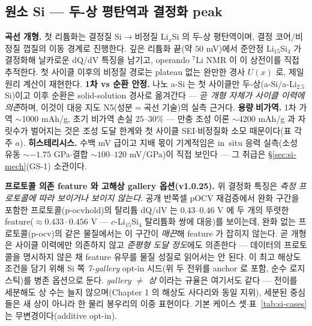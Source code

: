 \subsection{원소 Si --- 두-상 평탄역과 결정화 peak}\label{ssec:si-elemental}
\textbf{곡선 개형.} 첫 리튬화는 결정질 Si$\to$비정질 Li$_x$Si 의 두-상 평탄역이며, 결정 코어/비정질 껍질의
이동 경계로 진행한다\cite{limthongkul2003,li_dahn2007}. 깊은 리튬화 끝(약 $50$
mV)에서 준안정 Li$_{15}$Si$_4$ 가 결정화해 날카로운 dQ/dV 특징을 남기고\cite{obrovac_christensen2004},
operando $^7$Li NMR 이 이 상전이를 직접 추적한다\cite{ogata_nmr2014}. 첫 사이클 이후의 비정질 경로는
plateau 없는 완만한 경사 $U(x)$ 로, 제일원리 계산이 재현한다\cite{chevrier_dahn2009}.
\textbf{1차 vs 순환 안정.} 나노 a-Si 는 첫 사이클만 두-상(a-Si$/$a-Li$_{2.5}$Si)이고 이후 순환은
solid-solution 경사로 옮겨간다\cite{wang_asi2013,mcdowell_coreshell2013} --- 곧 \emph{개형 자체가 사이클 이력에 의존}하며, 이것이
대응 지도 N5(성분$=$곡선 기술)의 실측 근거다. \textbf{용량$\cdot$비가역.} 1차 가역 $\sim$1000 mAh/g,
초기 비가역 손실 $25$--$30\%$\cite{limthongkul2003} --- 만충 조성 이론 $\sim$4200 mAh/g\cite{wen_huggins1981}
과 자릿수가 벌어지는 것은 조성 도달 한계와 첫 사이클 SEI$\cdot$비정질화 소모 때문이다(표 각주 $a$).
\textbf{히스테리시스.} 수백 mV 급이고 지배 몫이 기계적임은 in~situ 응력 실측(소성 유동 $\sim-1.75$
GPa$\cdot$결합 $\sim100$--$120$ mV/GPa)이 직접 보인다\cite{sethuraman_stressevo2010,sethuraman_stresspot2010}
--- 그 취급은 \S\ref{sec:si-mech}(GS-1) 소관이다.

\textbf{프로토콜 의존 feature 와 고해상 gallery 옵션(v1.0.25).} 위 결정화 특징은 \emph{측정 프로토콜에 따라
보이거나 보이지 않는다}. 공개 반쪽셀 pOCV 재검증에서 완화 구간을 포함한 프로토콜(p-ocvhold)의 탈리튬 dQ/dV 는
$0.43$--$0.46$ V 에 두 개의 뚜렷한 feature($\approx0.433\cdot0.456$ V --- $c$-Li$_{15}$Si$_4$ 탈리튬화 쌍에
대응)를 보이는데, 완화 없는 프로토콜(p-ocv)의 같은 물질에서는 이 구간이 \emph{매끈}해 feature 가 잡히지 않는다.
곧 개형은 사이클 이력에만 의존하지 않고 \emph{준평형 도달 정도}에도 의존한다 --- 데이터의 프로토콜을 명시하지
않은 채 feature 유무를 물질 성질로 읽어서는 안 된다. 이 최고 해상도 조건을 담기 위해 Si 쪽 \emph{7-gallery}
opt-in 시드(위 두 전위를 anchor 로 포함, 순수 로지스틱)를 병존 옵션으로 둔다. \emph{gallery $\ne$ 상}
이라는 규율은 여기서도 같다 --- 전이를 세분해도 상 수는 늘지 않으며(Chapter 1 의 해상도 사다리와 동일 지위),
세분된 중심들은 새 상이 아니라 한 물리 봉우리의 이중 표현이다. 기본 케이스 셋$\cdot$표~\ref{tab:si-cases} 는
무변경이다(additive opt-in).

